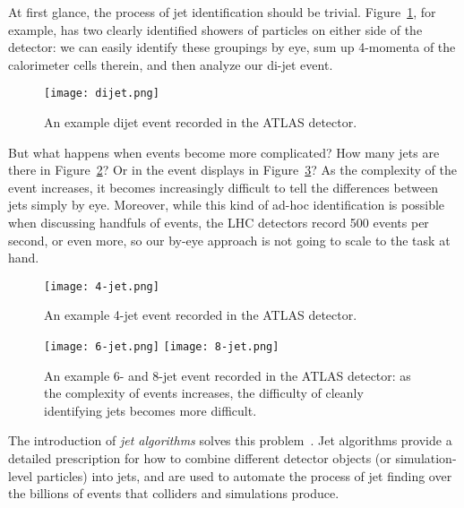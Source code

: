 At first glance, the process of jet identification should be trivial. Figure~\ref{fig:jets:dijet}, for example, has two clearly identified showers of particles on either side of the detector: we can easily identify these groupings by eye, sum up 4-momenta of the calorimeter cells therein, and then analyze our di-jet event.



\begin{figure}
\centering
\texttt{[image: dijet.png]}
\label{fig:jets:dijet}
\caption{An example dijet event recorded in the ATLAS detector.}
\end{figure}


But what happens when events become more complicated? How many jets are there in Figure~\ref{fig:jets:4-jet}? Or in the event displays in Figure~\ref{fig:jets:many-jet}? As the complexity of the event increases, it becomes increasingly difficult to tell the differences between jets simply by eye. Moreover, while this kind of ad-hoc identification is possible when discussing handfuls of events, the LHC detectors record 500 events per second, or even more, so our by-eye approach is not going to scale to the task at hand. 


\begin{figure}
\centering
\texttt{[image: 4-jet.png]}
\label{fig:jets:4-jet}
\caption{An example 4-jet event recorded in the ATLAS detector.}
\end{figure}




\begin{figure}
\centering
\texttt{[image: 6-jet.png]}
\texttt{[image: 8-jet.png]}
\label{fig:jets:many-jet}
\caption{An example 6- and 8-jet event recorded in the ATLAS detector: as the complexity of events increases, the difficulty of cleanly identifying jets becomes more difficult.}
\end{figure}



The introduction of \textit{jet algorithms} solves this problem~\cite{Jetography}. Jet algorithms provide a detailed prescription for how to combine different detector objects (or simulation-level particles) into jets, and are used to automate the process of jet finding over the billions of events that colliders and simulations produce.

